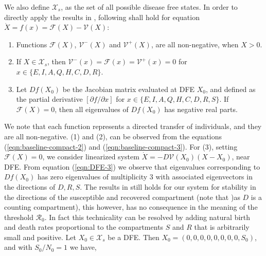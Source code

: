 \documentclass[authoryear,preprint]{elsarticle}
\begin{document}
%
%
We also define $\mathcal{X}_s$, as the set of all possible disease free states. In order to directly apply the results in \cite{VANDENDRIESSCHE200229}, following shall hold for equation $\dot{X} = f(x) = \mathcal{F}(X) - \mathcal{V}(X)$:
\begin{enumerate}
	\item Functions $\mathcal{F}(X)$, $\mathcal{V}^{-}(X)$ and $\mathcal{V}^{+}(X)$, are all non-negative, when $X > 0$.
	\item If $X \in \mathcal{X}_s$, then $\mathcal{V}^{-}(x)=\mathcal{F}(x)=\mathcal{V}^{+}(x)=0$ for $x \in \{E, I, A, Q, H, C, D, R\}$.
	\item Let $Df(X_0)$ be the Jacobian matrix evaluated at DFE $X_0$, and defined as the partial derivative $[{\partial f}/{\partial x}]$ for $x \in \{E, I, A, Q, H, C, D, R, S\}$. If $\mathcal{F}(X) = 0$, then all eigenvalues of $Df(X_0)$ has negative real parts.
\end{enumerate}
We note that each function represents a directed transfer of individuals, and they are all non-negative. (1) and (2), can be observed from the equations (\ref{eqn:baseline-compact-2}) and (\ref{eqn:baseline-compact-3}).  For (3), setting $\mathcal{F}(X) = 0$, we consider linearized system $\dot{X} = - D\mathcal{V}(X_0)(X-X_0)$, near DFE. From equation (\ref{eqn:DFE-3}) we observe that eigenvalues corresponding to $Df(X_0)$ has zero eigenvalues of multiplicity $3$ with associated eigenvectors in the directions of $D, R, S$. The results in \cite{VANDENDRIESSCHE200229} still holds for our system for stability in the directions of the susceptible and recovered compartment (note that )as $D$ is a counting compartment), this however, has no consequence in the meaning of the threshold $\mathcal{R}_0$. In fact this technicality can be resolved by adding natural birth and death rates proportional to the compartments $S$ and $R$ that is arbitrarily small and positive. 
%
%
Let $X_0 \in \mathcal{X}_s$ be a DFE. Then $X_0 = \left( 0, 0, 0, 0, 0, 0, 0, 0, S_0 \right) $, and with $S_0/N_0=1$ we have, 
%
%
\end{document}
